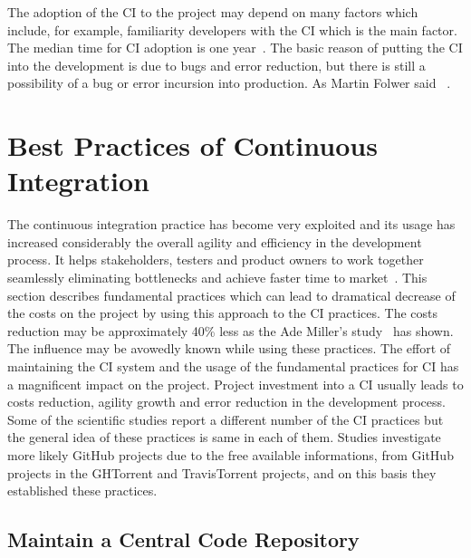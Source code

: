 The adoption of the CI to the project may depend on many factors which include, for example, familiarity developers with the CI which is the main factor. The median time for CI adoption is one year~\cite{COPE}. The basic reason of putting the CI into the development is due to bugs and error reduction, but there is still a possibility of a bug or error incursion into production. As Martin Folwer said ~\cite{MartinFowler}.

\section{Best Practices of Continuous Integration}

The continuous integration practice has become very exploited and its usage has increased considerably the overall agility and efficiency in the development process. It helps stakeholders, testers and product owners to work together seamlessly eliminating bottlenecks and achieve faster time to market~\cite{CI-BP1}. This section describes fundamental practices which can lead to dramatical decrease of the costs on the project by using this approach to the CI practices. The costs reduction may be approximately 40\% less as the Ade Miller's study~\cite{100DaysOfCI} has shown. The influence may be avowedly known while using these practices. The effort of maintaining the CI system and the usage of the fundamental practices for CI has a magnificent impact on the project. Project investment into a CI usually leads to costs reduction, agility growth and error reduction in the development process. Some of the scientific studies report a different number of the CI practices but the general idea of these practices is same in each of them. Studies investigate more likely GitHub projects due to the free available informations, from GitHub projects in the GHTorrent and TravisTorrent projects, and on this basis they established these practices.

\subsection{Maintain a Central Code Repository}

